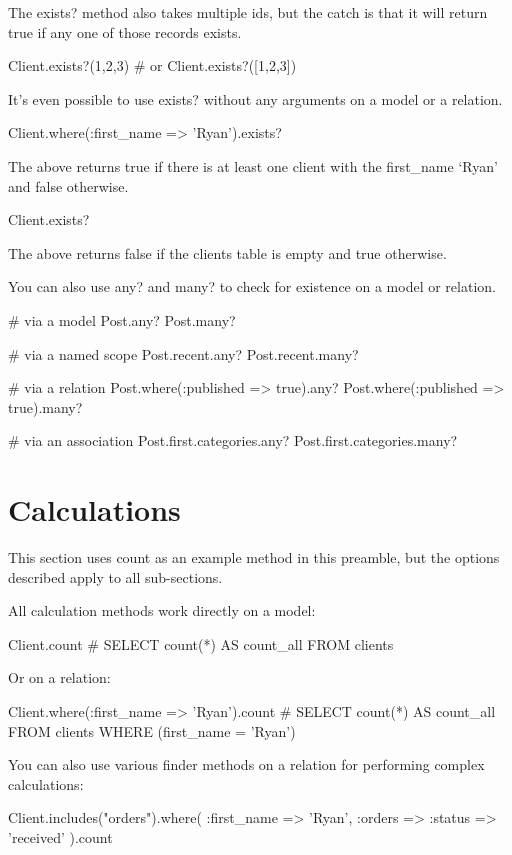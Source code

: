 \documentclass[10pt]{book}
\newenvironment{code}{%
  \scriptsize
    \verbatim
}{%
    \endverbatim
    \newline
}
\begin{document}
The exists? method also takes multiple ids, but the catch is that it will return true if any one of those records exists.
\begin{code}
Client.exists?(1,2,3)
# or
Client.exists?([1,2,3])
\end{code}

It’s even possible to use exists? without any arguments on a model or a relation.
\begin{code}
Client.where(:first_name => 'Ryan').exists?
\end{code}

The above returns true if there is at least one client with the first\_name ‘Ryan’ and false otherwise.
\begin{code}
Client.exists?
\end{code}

The above returns false if the clients table is empty and true otherwise.

You can also use any? and many? to check for existence on a model or relation.
\begin{code}
# via a model
Post.any?
Post.many?
 
# via a named scope
Post.recent.any?
Post.recent.many?
 
# via a relation
Post.where(:published => true).any?
Post.where(:published => true).many?
 
# via an association
Post.first.categories.any?
Post.first.categories.many?
\end{code}

\section{ Calculations}

This section uses count as an example method in this preamble, but the options described apply to all sub-sections.

All calculation methods work directly on a model:
\begin{code}
Client.count
# SELECT count(*) AS count_all FROM clients
\end{code}

Or on a relation:
\begin{code}
Client.where(:first_name => 'Ryan').count
# SELECT count(*) AS count_all FROM clients WHERE (first_name = 'Ryan')
\end{code}

You can also use various finder methods on a relation for performing complex calculations:
\begin{code}
Client.includes("orders").where(
:first_name => 'Ryan', :orders => {:status => 'received'}
).count
\end{code}
\end{document}
